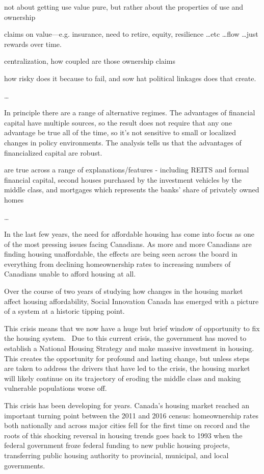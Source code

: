 not about getting use value pure, but rather about the properties of use and ownership

claims on value---e.g. insurance, need to retire, equity, resilience \dots etc \dots flow \dots just rewards over time.

centralization, 
how coupled are those ownership claims

how risky does it because to fail, and sow hat political linkages does that create. 


\dots

In principle there are a range of alternative regimes.
The advantages of financial capital have multiple sources, so the result does not require that any one advantage be true all of the time, so it's not sensitive to small or localized changes in policy environments. The analysis tells us that the advantages of financialized capital are robust.

are true across a range of explanations/features - including REITS and formal financial capital, second houses purchased by the investment vehicles by the middle class, and mortgages which represents the banks' share of privately owned homes

\dots


In the last few years, the need for affordable housing has come into focus as one of the most pressing issues facing Canadians. As more and more Canadians are finding housing unaffordable, the effects are being seen across the board in everything from declining homeownership rates to increasing numbers of Canadians unable to afford housing at all.

Over the course of two years of studying how changes in the housing market affect housing affordability, Social Innovation Canada has emerged with a picture of a system at a historic tipping point. 

This crisis means that we now have a huge but brief window of opportunity to fix the housing system.  Due to this current crisis, the government has moved to establish a National Housing Strategy and make massive investment in housing. This creates the opportunity for profound and lasting change, but unless steps are taken to address the drivers that have led to the crisis, the housing market will likely continue on its trajectory of eroding the middle class and making vulnerable populations worse off.   

This crisis has been developing for years. Canada's housing market reached an important turning point between the 2011 and 2016 census: homeownership rates both nationally and across major cities fell for the first time on record and the roots of this shocking reversal in housing trends goes back to 1993 when the federal government froze federal funding to new public housing projects, transferring public housing authority to provincial, municipal, and local governments. 

